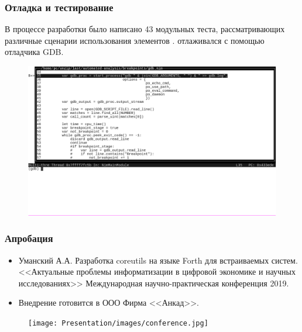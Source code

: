 \begin{frame}%
\frametitle{Отладка и тестирование {\ProgModule}}
    В процессе разработки {\ProgModule} было написано 43 модульных теста, рассматривающих
    различные сценарии использования элементов {\ProgModule}. {\ProgModule} отлаживался
    с помощью отладчика GDB.
    
    \vspace{3ex}
    \begin{figure}[!htbp]
        \begin{adjustbox}{max totalsize={1.2\textwidth}{1.2\textheight}}
            \includegraphics[trim={0 4ex 0 0 0},clip,width=\linewidth]{images/running-gdb.png}
        \end{adjustbox}
    \end{figure}

\end{frame}

\begin{frame}%
\frametitle{Апробация}
    \begin{itemize}
        \item Уманский А.А. Разработка coreutils на языке Forth для встраиваемых систем.
            <<Актуальные проблемы информатизации в цифровой экономике и научных исследованиях>>
            Международная научно-практическая конференция 2019.
        \item Внедрение {\ProgModule} готовится в ООО Фирма <<Анкад>>.
    \end{itemize}
    \begin{figure}[!htbp]
        \begin{adjustbox}{max totalsize={0.6\textwidth}{0.6\textheight}}
            \texttt{[image: Presentation/images/conference.jpg]}
        \end{adjustbox}
    \end{figure}
\end{frame}

